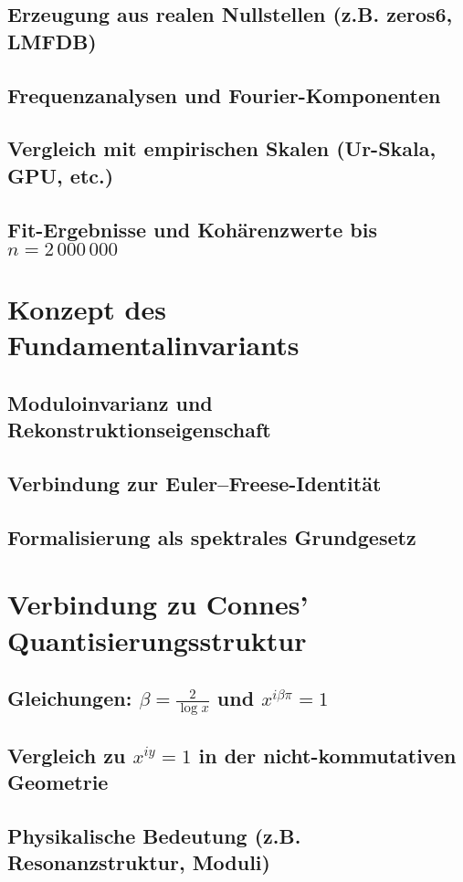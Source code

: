 \documentclass[12pt]{article}
\begin{document}
\subsection{Erzeugung aus realen Nullstellen (z.B. zeros6, LMFDB)}
\subsection{Frequenzanalysen und Fourier-Komponenten}
\subsection{Vergleich mit empirischen Skalen (Ur-Skala, GPU, etc.)}
\subsection{Fit-Ergebnisse und Kohärenzwerte bis \(n = 2\,000\,000\)}

\section{Konzept des Fundamentalinvariants}
\subsection{Moduloinvarianz und Rekonstruktionseigenschaft}
\subsection{Verbindung zur Euler–Freese-Identität}
\subsection{Formalisierung als spektrales Grundgesetz}

\section{Verbindung zu Connes’ Quantisierungsstruktur}
\subsection{Gleichungen: \(\beta = \frac{2}{\log x}\) und \(x^{i\beta\pi} = 1\)}
\subsection{Vergleich zu \(x^{iy} = 1\) in der nicht-kommutativen Geometrie}
\subsection{Physikalische Bedeutung (z.B. Resonanzstruktur, Moduli)}
\end{document}
